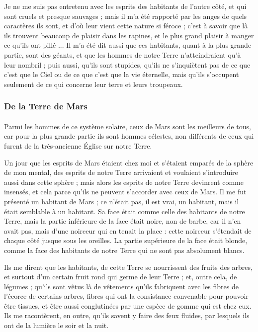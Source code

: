 \documentclass[a4paper, 11pt, oneside, landscape]{article}
\begin{document}
Je ne me suis pas entretenu avec les esprits des habitants de l'autre côté, et qui sont cruels et presque sauvages ; mais il m'a été rapporté par les anges de quels caractères ils sont, et d'où leur vient cette nature si féroce ; c'est à savoir que là ils trouvent beaucoup de plaisir dans les rapines, et le plus grand plaisir à manger ce qu'ils ont pillé ... Il m'a été dit aussi que ces habitants, quant à la plus grande partie, sont des géants, et que les hommes de notre Terre n'atteindraient qu'à leur nombril ; puis aussi, qu'ils sont stupides, qu'ils ne s'inquiètent pas de ce que c'est que le Ciel ou de ce que c'est que la vie éternelle, mais qu'ils s'occupent seulement de ce qui concerne leur terre et leurs troupeaux.

\subsubsection{De la Terre de Mars}
\paragraph{}
Parmi les hommes de ce système solaire, ceux de Mars sont les meilleurs de tous, car pour la plus grande partie ils sont hommes célestes, non différents de ceux qui furent de la très-ancienne Église sur notre Terre.

Un jour que les esprits de Mars étaient chez moi et s'étaient emparés de la sphère de mon mental, des esprits de notre Terre arrivaient et voulaient s'introduire aussi dans cette sphère ; mais alors les esprits de notre Terre devinrent comme insensés, et cela parce qu'ils ne peuvent s'accorder avec ceux de Mars. Il me fut présenté un habitant de Mars ; ce n'était pas, il est vrai, un habitant, mais il était semblable à un habitant. Sa face était comme celle des habitants de notre Terre, mais la partie inférieure de la face était noire, non de barbe, car il n'en avait pas, mais d'une noirceur qui en tenait la place : cette noirceur s'étendait de chaque côté jusque sous les oreilles. La partie supérieure de la face était blonde, comme la face des habitants de notre Terre qui ne sont pas absolument blancs.

Ils me dirent que les habitants, de cette Terre se nourrissent des fruits des arbres, et surtout d'un certain fruit rond qui germe de leur Terre ; et, outre cela, de légumes ; qu'ils sont vêtus là de vêtements qu'ils fabriquent avec les fibres de l'écorce de certains arbres, fibres qui ont la consistance convenable pour pouvoir être tissues, et être aussi conglutinées par une espèce de gomme qui est chez eux. Ils me racontèrent, en outre, qu'ils savent y faire des feux fluides, par lesquels ils ont de la lumière le soir et la nuit.
\end{document}
